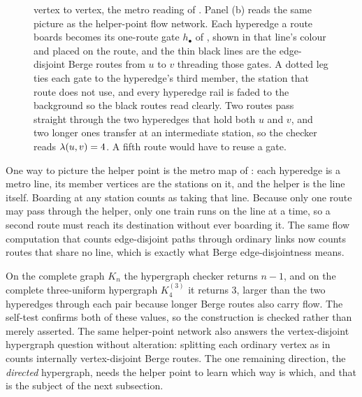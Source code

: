 \begin{figure}[htbp]
{vertex to vertex, the metro reading of . Panel (b) reads the
same picture as the helper-point flow network. Each hyperedge a route boards
becomes its one-route gate $h_{\bullet}$ of , shown in that
line's colour and placed on the route, and the thin black lines are the
edge-disjoint Berge routes from $u$ to $v$ threading those gates. A dotted leg ties
each gate to the hyperedge's third member, the station that route does not use, and
every hyperedge rail is faded to the background so the black routes read clearly. Two routes pass straight through the two hyperedges that
hold both $u$ and $v$, and two longer ones transfer at an intermediate station, so
the checker reads $\lambda(u, v) = 4$. A fifth route would have to reuse a gate.}
\label{fig:hyper-gadget-example}
\end{figure}
One way to picture the helper point is the metro map of : each hyperedge is a metro line, its member vertices are the stations on it, and the helper is the line itself. Boarding at any station counts as taking that line. Because only one route may pass through the helper, only one train runs on the line at a time, so a second route must reach its destination without ever boarding it. The same flow computation that counts edge-disjoint paths through ordinary links now counts routes that share no line, which is exactly what Berge edge-disjointness means.

On the complete graph $K_n$ the hypergraph checker returns $n - 1$, and on the complete three-uniform hypergraph $K_4^{(3)}$ it returns $3$, larger than the two hyperedges through each pair because longer Berge routes also carry flow. The self-test confirms both of these values, so the construction is checked rather than merely asserted. The same helper-point network also answers the vertex-disjoint hypergraph question without alteration: splitting each ordinary vertex as in  counts internally vertex-disjoint Berge routes. The one remaining direction, the \emph{directed} hypergraph, needs the helper point to learn which way is which, and that is the subject of the next subsection.

